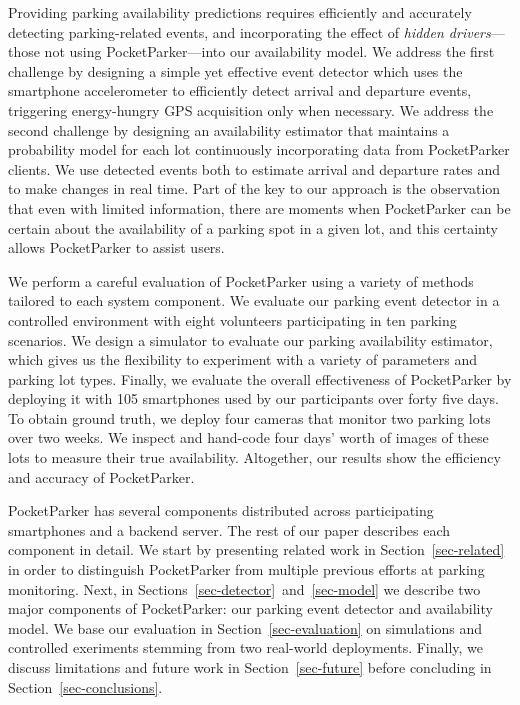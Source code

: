 Providing parking availability predictions requires efficiently and
accurately detecting parking-related events, and incorporating the effect of
\textit{hidden drivers}---those not using PocketParker---into our
availability model. We address the first challenge by designing a simple yet
effective event detector which uses the smartphone accelerometer to
efficiently detect arrival and departure events, triggering energy-hungry GPS
acquisition only when necessary. We address the second challenge by designing
an availability estimator that maintains a probability model for each lot
continuously incorporating data from PocketParker clients. We use detected
events both to estimate arrival and departure rates and to make changes in
real time. Part of the key to our approach is the observation that even with
limited information, there are moments when PocketParker can be certain about
the availability of a parking spot in a given lot, and this certainty allows 
PocketParker to assist users.

We perform a careful evaluation of PocketParker using a variety of methods
tailored to each system component. We evaluate our parking event detector in
a controlled environment with eight volunteers participating in ten parking
scenarios. We design a simulator to evaluate our parking availability
estimator, which gives us the flexibility to experiment with a variety of
parameters and parking lot types. Finally, we evaluate the overall
effectiveness of PocketParker by deploying it with 105 smartphones used by
our participants over forty five days. To obtain ground truth, we deploy four
cameras that monitor two parking lots over two weeks. We inspect and
hand-code four days' worth of images of these lots to measure their true
availability. Altogether, our results show the efficiency and accuracy
of PocketParker.

PocketParker has several components
distributed across participating smartphones and a backend server. The rest
of our paper describes each component in detail. We start by presenting
related work in Section~\ref{sec-related} in order to distinguish
PocketParker from multiple previous efforts at parking monitoring. Next, in
Sections~\ref{sec-detector}~and~\ref{sec-model} we describe two major 
components of PocketParker: our parking event detector and availability
model.  We base our evaluation in Section~\ref{sec-evaluation} on simulations
and controlled exeriments stemming from two real-world deployments.  Finally,
we discuss limitations and future work in Section~\ref{sec-future} before
concluding in Section~\ref{sec-conclusions}.

